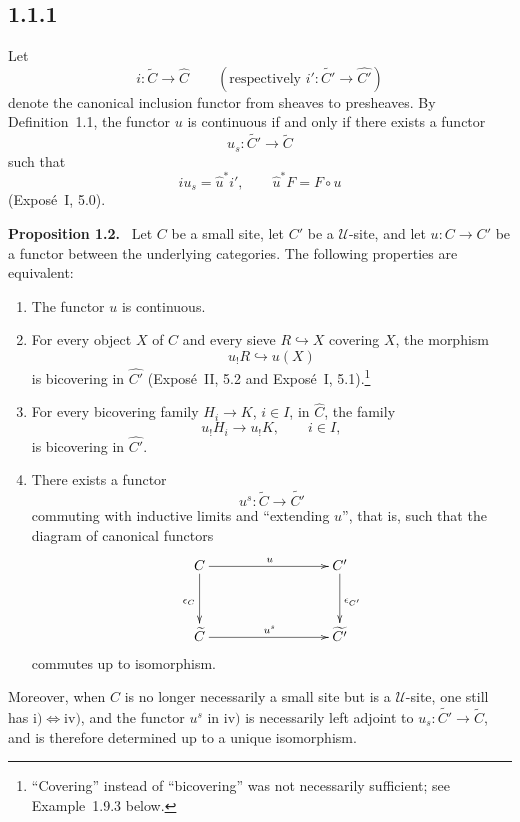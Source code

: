 \documentclass[11pt]{article}
\newcommand{\U}{\mathcal{U}}
\newenvironment{statement}[1]{\par\medskip\noindent\textbf{#1.}\ }{\par\medskip}
\begin{document}
\subsection*{1.1.1}
Let
\[
i:\widetilde C\to \widehat C\qquad (\text{respectively } i':\widetilde{C'}\to \widehat{C'})
\]
denote the canonical inclusion functor from sheaves to presheaves. By Definition~1.1, the functor \(u\) is continuous if and only if there exists a functor
\[
u_s:\widetilde{C'}\to\widetilde C
\]
such that
\[
 i u_s = \widehat u^{\ast} i',\qquad \widehat u^{\ast}F=F\circ u
\]
(Expos\'e~I, 5.0).

\begin{statement}{Proposition 1.2}
Let \(C\) be a small site, let \(C'\) be a \(\U\)-site, and let \(u:C\to C'\) be a functor between the underlying categories. The following properties are equivalent:
\begin{enumerate}[label=\roman*)]
\item The functor \(u\) is continuous.

\item For every object \(X\) of \(C\) and every sieve \(R\hookrightarrow X\) covering \(X\), the morphism
\[
u_!R\hookrightarrow u(X)
\]
is bicov\-ering in \(\widehat{C'}\) (Expos\'e~II, 5.2 and Expos\'e~I, 5.1).\footnote{``Covering'' instead of ``bicov\-ering'' was not necessarily sufficient; see Example~1.9.3 below.}

\item For every bicov\-ering family \(H_i\to K\), \(i\in I\), in \(\widehat C\), the family
\[
u_!H_i\to u_!K,\qquad i\in I,
\]
is bicov\-ering in \(\widehat{C'}\).

\item There exists a functor
\[
u^s:\widetilde C\to\widetilde{C'}
\]
commuting with inductive limits and ``extending \(u\)'', that is, such that the diagram of canonical functors
\[
\xymatrix@C=3cm@R=1.25cm{
  C \ar[r]^{u} \ar[d]_{\epsilon_C} & C' \ar[d]^{\epsilon_{C'}}\\
\widetilde C \ar[r]^{u^s}& \widetilde{C'}
}
\]
commutes up to isomorphism.
\end{enumerate}
Moreover, when \(C\) is no longer necessarily a small site but is a \(\U\)-site, one still has \(\mathrm{i)}\Leftrightarrow\mathrm{iv)}\), and the functor \(u^s\) in \(\mathrm{iv)}\) is necessarily left adjoint to \(u_s:\widetilde{C'}\to\widetilde C\), and is therefore determined up to a unique isomorphism.
\end{statement}
\end{document}
